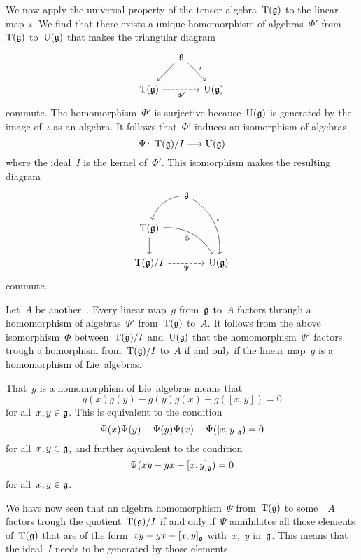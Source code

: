 \begin{fluff}
  We now apply the universal property of the tensor algebra~$\operatorname{T}(\mathfrak{g})$ to the linear map~$\iota$.
  We find that there exists a unique homomorphism of algebras~$\Phi'$ from~$\operatorname{T}(\mathfrak{g})$ to~$\operatorname{U}(\mathfrak{g})$ that makes the triangular diagram
  \[
    \begin{tikzcd}[column sep = small]
      {}
      &
      \glie
      \arrow{dl}
      \arrow{dr}[above right]{\iota}
      &
      {}
      \\
      \Tensor(\glie)
      \arrow[dashed]{rr}[below]{\Phi'}
      &
      {}
      &
      \Univ(\glie)
    \end{tikzcd}
  \]
  commute.
  The homomorphism~$\Phi'$ is surjective because~$\operatorname{U}(\mathfrak{g})$ is generated by the image of~$\iota$ as an algebra.
  It follows that~$\Phi'$ induces an isomorphism of algebras
  \[
    \Psi
    \colon
    \Tensor(\glie) / I
    \to
    \Univ(\glie)
  \]
  where the ideal~$I$ is the kernel of~$\Phi'$.
  This isomorphism makes the resulting diagram
   \[
    \begin{tikzcd}[column sep = small]
      {}
      &
      \glie
      \arrow[bend right]{dl}
      \arrow[bend left]{ddr}[above right]{\iota}
      &
      {}
      \\
      \Tensor(\glie)
      \arrow[bend left]{drr}[below left]{\Phi}
      \arrow{d}
      &
      {}
      &
      {}
      \\
      \Tensor(\glie)/I
      \arrow[dashed]{rr}[below]{\Psi}
      &
      {}
      &
      \Univ(\glie)
    \end{tikzcd}
  \]
  commute.
 
  Let~$A$ be another~\algebra{$\kf$}.
  Every linear map~$g$ from~$\mathfrak{g}$ to~$A$ factors through a homomorphism of algebras~$\Psi'$ from~$\operatorname{T}(\mathfrak{g})$ to~$A$.
  It follows from the above isomorphism~$\Phi$ between~$\operatorname{T}(\mathfrak{g}) / I$ and~$\operatorname{U}(\mathfrak{g})$ that the homomorphism~$\Psi'$ factors trough a homorphism from~$\operatorname{T}(\mathfrak{g}) / I$ to~$A$ if and only if the linear map~$g$ is a homomorphism of Lie~algebras.

  That~$g$ is a homomorphism of Lie~algebras means that
  \[
    g(x) g(y) - g(y) g(x) - g([x,y]) = 0
  \]
  for all~$x, y \in \mathfrak{g}$.
  This is equivalent to the condition
  \[
    \Psi(x) \Psi(y) - \Psi(y) \Psi(x) - \Psi([x,y]_{\mathfrak{g}})
    =
    0
  \]
  for all~$x, y \in \mathfrak{g}$, and further äquivalent to the condition
  \[
    \Psi( xy - yx - [x,y]_{\mathfrak{g}} )
    =
    0
  \]
  for all~$x, y \in \mathfrak{g}$.

  We have now seen that an algebra homomorphism~$\Psi$ from~$\operatorname{T}(\mathfrak{g})$ to some~\algebra{$\kf$}~$A$ factors trough the quotient~$\operatorname{T}(\mathfrak{g})/I$ if and only if~$\Psi$ annihilates all those elements of~$\operatorname{T}(\mathfrak{g})$ that are of the form~$xy - yx - [x,y]_{\mathfrak{g}}$ with~$x$,~$y$ in~$\mathfrak{g}$.
  This means that the ideal~$I$ needs to be generated by those elements.
  

\end{fluff}
